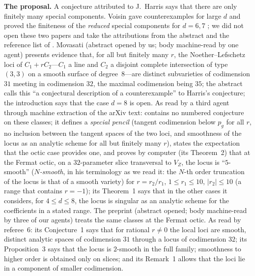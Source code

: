\documentclass[11pt]{article}
\numberwithin{equation}{section}
\theoremstyle{remark}
\newcommand{\VZ}{V_Z}
\newcommand{\run}[1]{\medskip\noindent\textbf{#1}}
\begin{document}
\run{The proposal.}
A conjecture attributed to J.~Harris says that there are only finitely many special components. Voisin gave
counterexamples for large $d$ \cite{Vo91} and proved the finiteness of the \emph{reduced} special components for
$d=6,7$ \cite{Vo90}; we did not open these two papers and take the attributions from the abstract and the
reference list of \cite{Mo21}. Movasati \cite{Mo21} (abstract opened by us; body machine-read by one agent) presents evidence
that, for all but finitely many $r$, the Noether--Lefschetz loci of $C_1+rC_2$---$C_1$ a line and $C_2$ a
disjoint complete intersection of type $(3,3)$ on a smooth surface of degree~$8$---are distinct subvarieties of
codimension $31$ meeting in codimension $32$, the maximal codimension being $35$; the abstract calls this ``a
conjectural description of a counterexample'' to Harris's conjecture; the introduction says that the case $d=8$ is open. As
read by a third agent through machine extraction of the arXiv text: \cite{Mo21} contains no numbered conjecture
on these classes; it defines a \emph{special pencil} (tangent codimension below $p_g$ for all $r$, no inclusion
between the tangent spaces of the two loci, and smoothness of the locus as an analytic scheme for all but finitely
many $r$), states the expectation that the octic case provides one, and proves by computer (its Theorem~2) that at
the Fermat octic, on a $32$-parameter slice transversal to $\VZ$, the locus is ``$5$-smooth'' (\emph{$N$-smooth}, in his terminology as we read it: the $N$-th order
truncation of the locus is that of a smooth variety) for $r=r_2/r_1$, $1\le r_1\le10$, $|r_2|\le10$ (a range that contains $r=-1$); its Theorem~1
says that in the other cases it considers, for $4\le d\le8$, the locus is singular as an analytic scheme for the
coefficients in a stated range. The
preprint \cite{Mo26} (abstract opened; body machine-read by three of our agents) treats the same classes at the
Fermat octic. As read by referee~6: its Conjecture~1 says that for rational $r\neq0$ the local loci are
smooth, distinct analytic spaces of codimension $31$ through a locus of codimension $32$; its Proposition~3 says
that the locus is $2$-smooth in the full family; smoothness to higher order is obtained only on slices; and its
Remark~1 allows that the loci lie in a component of smaller codimension.
\end{document}
